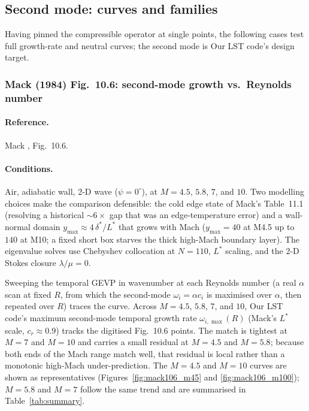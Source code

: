 \documentclass[11pt]{article}
\begin{document}
\subsection{Second mode: curves and families}
\label{sec:secondmode}
Having pinned the compressible operator at single points, the following cases test full
growth-rate and neutral curves; the second mode is Our LST code's design target.

\subsubsection{Mack (1984) Fig.~10.6: second-mode growth vs.\ Reynolds number}
\label{sec:mack106}

\paragraph{Reference.} Mack \cite{mack1984}, Fig.~10.6.

\paragraph{Conditions.} Air, adiabatic wall, 2-D wave ($\psi=0^\circ$), at $M=4.5$, $5.8$, $7$, and
$10$. Two modelling choices make the comparison defensible: the cold edge state of Mack's
Table~11.1 \cite{mack1984} (resolving a historical $\sim\!6\times$ gap that was an
edge-temperature error) and a
wall-normal domain $y_{\max}\approx4\,\delta^\ast/L^\ast$ that grows with Mach ($y_{\max}=40$ at
M4.5 up to $140$ at M10; a fixed short box starves the thick high-Mach boundary layer). The
eigenvalue solves use Chebyshev collocation at $N=110$, $L^\ast$ scaling, and the 2-D Stokes
closure $\lambda/\mu=0$.

Sweeping the temporal GEVP in wavenumber at each Reynolds number (a real $\alpha$ scan at fixed $R$,
from which the second-mode $\omega_i=\alpha c_i$ is maximised over $\alpha$, then repeated over $R$)
traces the curve. Across $M=4.5$, $5.8$, $7$, and $10$, Our LST code's maximum second-mode temporal
growth rate $\omega_{i,\max}(R)$ (Mack's $L^\ast$ scale, $c_r\approx0.9$) tracks the digitised
Fig.~10.6 points. The match is tightest at $M=7$ and $M=10$ and carries a small residual at $M=4.5$
and $M=5.8$; because both ends of the Mach range match well, that residual is local rather than a
monotonic high-Mach under-prediction. The $M=4.5$ and $M=10$ curves are shown as representatives
(Figures~\ref{fig:mack106_m45} and \ref{fig:mack106_m100}); $M=5.8$ and $M=7$ follow the same trend
and are summarised in Table~\ref{tab:summary}.
\end{document}
